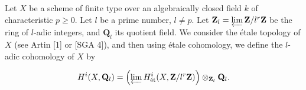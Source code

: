 Let $X$ be a scheme of finite type over an algebraically closed field $k$ of characteristic $p \geqslant 0$. Let $l$ be a prime number, $l \neq p$. Let $\mathbf{Z}_l = \varprojlim \mathbf{Z}/l^r\mathbf{Z}$ be the ring of $l$-adic integers, and $\mathbf{Q}_l$ its quotient field. We consider the étale topology of $X$ (see Artin [1] or [SGA 4]), and then using étale cohomology, we define the $l$-adic cohomology of $X$ by

$$H^i(X, \mathbf{Q}_l) = \left( \varprojlim H^i_{\text{ét}}(X, \mathbf{Z}/l^r\mathbf{Z}) \right) \otimes_{\mathbf{Z}_l} \mathbf{Q}_l.$$
